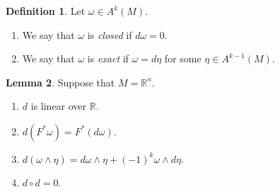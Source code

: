 \documentclass[10pt,letterpaper,cm]{nupset}
\theoremstyle{definition}
\newtheorem{definition}{Definition}[subsection]
\theoremstyle{theorem}
\newtheorem{lemma}[definition]{Lemma}
\theoremstyle{remark}
\newcommand{\R}{\mathbb R}
\newcommand{\1}{\mathbf{1}}
\newcommand{\0}{\vec 0}
\begin{document}
\begin{definition} Let $\omega \in A^k(M)$.
\begin{enumerate}
\item We say that $\omega$ is \textit{closed} if $d \omega = 0$.
\item We say that $\omega$ is \textit{exact} if $\omega = d \eta$ for some $\eta \in A^{k-1}(M)$.
\end{enumerate}
\end{definition}

\begin{lemma}\label{l15} Suppose that $M = \R^n$.
\begin{enumerate}[label=(\arabic*)]
\item $d$ is linear over $\R$.
\item $d(F^{\ast} \omega) = F^{\ast}(d \omega).$
\item $d( \omega \wedge \eta) = d \omega \wedge \eta + ({-1})^k\omega \wedge d \eta.$
\item $d \circ d = 0$.
\end{enumerate}
\end{lemma}
\end{document}
